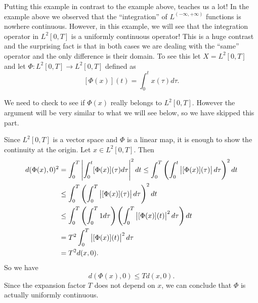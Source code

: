 \begin{observation}
	Putting this example in contrast to the example above, teaches us a lot! In the example above we observed that the ``integration'' of $ L^(-\infty,+\infty) $ functions is nowhere continuous. However, in this example, we will see that the integration operator in $ L^2[0,T] $ is a uniformly  continuous operator! This is a huge contrast and the surprising fact is that in both cases we are dealing with the ``same'' operator and the only difference is their domain. To see this let $ X = L^2[0,T] $ and let $ \Phi: L^2[0,T] \to L^2[0,T] $ defined as
	\[ [\Phi(x)](t) = \int_{0}^{t} x(\tau)d\tau. \]
	\begin{remark}
		We need to check to see if $ \Phi(x) $ really belongs to $ L^2[0,T] $. However the argument will be very similar to what we will see below, so we have skipped this part. 
	\end{remark}
	Since $ L^2[0,T] $ is a vector space and $ \Phi  $ is a linear map, it is enough to show the continuity at the origin. Let $ x\in L^2[0,T] $. Then
	\begin{align*}
		d(\Phi(x),0)^2 &= \int_{0}^{T} \left|\int_{0}^{t} [\Phi(x)](\tau)d\tau\right|^2 dt \leq \int_{0}^{T} \left(\int_{0}^{t} \left|[\Phi(x)](\tau)\right|d\tau\right)^2 dt \\ 
		& \leq \int_{0}^{T} \left(\int_{0}^{T} \left|[\Phi(x)](\tau)\right|d\tau\right)^2 dt \\
		& \leq \int_{0}^{T} \left( \int_{0}^{T} 1 d\tau \right) \left( \int_{0}^{T}\left|[\Phi(x)](t)\right|^2 d\tau \right) dt \\
		&= T^2 \int_{0}^{T}\left|[\Phi(x)](t)\right|^2 d\tau \\
		&= T^2 d(x,0).
	\end{align*}
	So we have
	\[ d(\Phi(x),0) \leq T d(x,0). \]
	Since the expansion factor $ T $ does not depend on $ x $, we can conclude that $ \Phi $ is actually uniformly continuous.
\end{observation}

